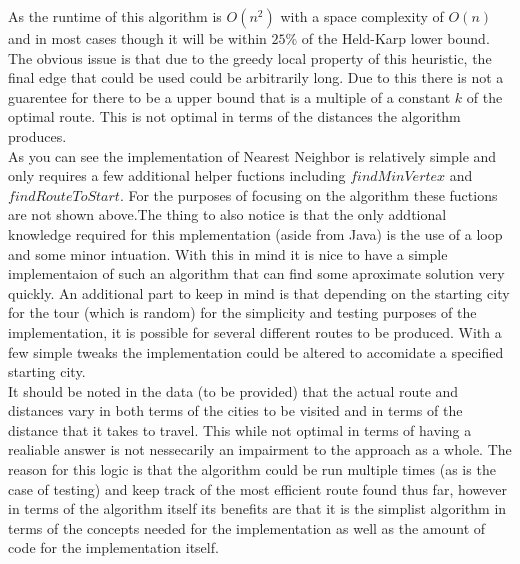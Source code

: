 \documentclass[midd]{thesis}
\newcommand{\tab}{\hspace*{2em}}
\begin{document}
As the runtime of this algorithm is $O(n^2)$\cite{htspc} with a space complexity of $O(n)$ and in most cases though it will be within $25\%$ of the Held-Karp lower bound\cite{htspc}. The obvious issue is that due to the greedy local property of this heuristic, the final edge that could be used could be arbitrarily long. Due to this there is not a guarentee for there to be a upper bound that is a multiple of a constant $k$ of the optimal route. This is not optimal in terms of the distances the algorithm produces.\\
\tab As you can see the implementation of Nearest Neighbor is relatively simple and only requires a few additional helper fuctions including $findMinVertex$ and\\ $findRouteToStart$. For the purposes of focusing on the algorithm these fuctions are not shown above.The thing to also notice is that the only addtional knowledge required for this mplementation (aside from Java) is the use of a loop and some minor intuation. With this in mind it is nice to have a simple implementaion of such an algorithm that can find some aproximate solution very quickly. An additional part to keep in mind is that depending on the starting city for the tour (which is random) for the simplicity and testing purposes of the implementation, it is possible for several different routes to be produced. With a few simple tweaks the implementation could be altered to accomidate a specified starting city. \\
\tab It should be noted in the data (to be provided) that the actual route and distances vary in both terms of the cities to be visited and in terms of the distance that it takes to travel. This while not optimal in terms of having a realiable answer is not nessecarily an impairment to the approach as a whole. The reason for this logic is that the algorithm could be run multiple times (as is the case of testing) and keep track of the most efficient route found thus far, however in terms of the algorithm itself its benefits are that it is the simplist algorithm in terms of the concepts needed for the implementation as well as the amount of code for the implementation itself.
\end{document}
